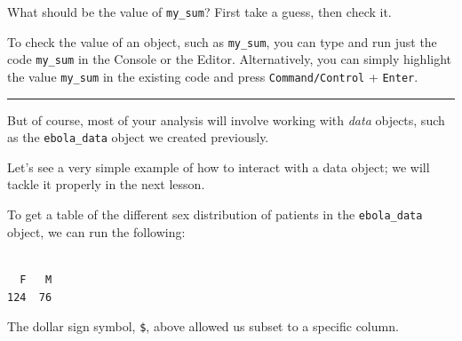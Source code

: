 \documentclass[
  letterpaper,
  DIV=11,
  numbers=noendperiod]{scrreprt}
\newenvironment{Shaded}{\begin{snugshade}}{\end{snugshade}}
\newcommand{\FunctionTok}[1]{\textcolor[rgb]{0.28,0.35,0.67}{#1}}
\newcommand{\NormalTok}[1]{\textcolor[rgb]{0.00,0.23,0.31}{#1}}
\newcommand{\SpecialCharTok}[1]{\textcolor[rgb]{0.37,0.37,0.37}{#1}}
\begin{document}
What should be the value of \texttt{my\_sum}? First take a guess, then
check it.

\begin{tcolorbox}[enhanced jigsaw, title=\textcolor{quarto-callout-note-color}{\faInfo}\hspace{0.5em}{Side Note}, colbacktitle=quarto-callout-note-color!10!white, leftrule=.75mm, arc=.35mm, opacityback=0, bottomrule=.15mm, rightrule=.15mm, toptitle=1mm, breakable, toprule=.15mm, colback=white, coltitle=black, colframe=quarto-callout-note-color-frame, bottomtitle=1mm, titlerule=0mm, left=2mm, opacitybacktitle=0.6]

To check the value of an object, such as \texttt{my\_sum}, you can type
and run just the code \texttt{my\_sum} in the Console or the Editor.
Alternatively, you can simply highlight the value \texttt{my\_sum} in
the existing code and press \texttt{Command/Control} + \texttt{Enter}.

\end{tcolorbox}

\begin{center}\rule{0.5\linewidth}{0.5pt}\end{center}

But of course, most of your analysis will involve working with
\emph{data} objects, such as the \texttt{ebola\_data} object we created
previously.

Let's see a very simple example of how to interact with a data object;
we will tackle it properly in the next lesson.

To get a table of the different sex distribution of patients in the
\texttt{ebola\_data} object, we can run the following:

\begin{Shaded}
\end{Shaded}

\begin{verbatim}

  F   M 
124  76 
\end{verbatim}

The dollar sign symbol, \texttt{\$}, above allowed us subset to a
specific column.
\end{document}
